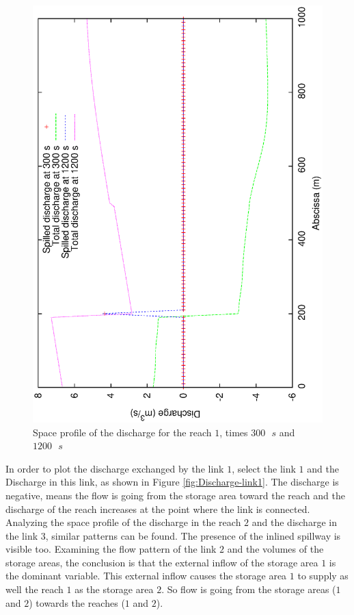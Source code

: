 \documentclass[a4paper,12pt]{article}
\begin{document}
\begin{figure}[h]
  \begin{center}
  \includegraphics[scale=0.5,angle=-90]{discharge_reach1}
  \caption{Space profile of the discharge for the reach $1$, times $300\mbox{ }s$ and $1200\mbox{ }s$}
  \label{fig:disch_R1}
  \end{center}
\end{figure}


In order to plot the discharge exchanged by the link $1$, select the
link $1$ and the Discharge in this link, as shown in Figure \ref{fig:Discharge-link1}.
The discharge is negative, means the flow is going from the storage
area toward the reach and the discharge of the reach increases at
the point where the link is connected. Analyzing the space profile
of the discharge in the reach $2$ and the discharge in the link $3$, similar
patterns can be found. The presence of the inlined spillway is visible
too. Examining the flow pattern of the link $2$ and the volumes of the
storage areas, the conclusion is that the external inflow of the storage
area $1$ is the dominant variable. This external inflow causes the storage
area $1$ to supply as well the reach $1$ as the storage area $2$. So flow
is going from the storage areas ($1$ and $2$) towards the reaches ($1$ and
$2$). 
\end{document}
